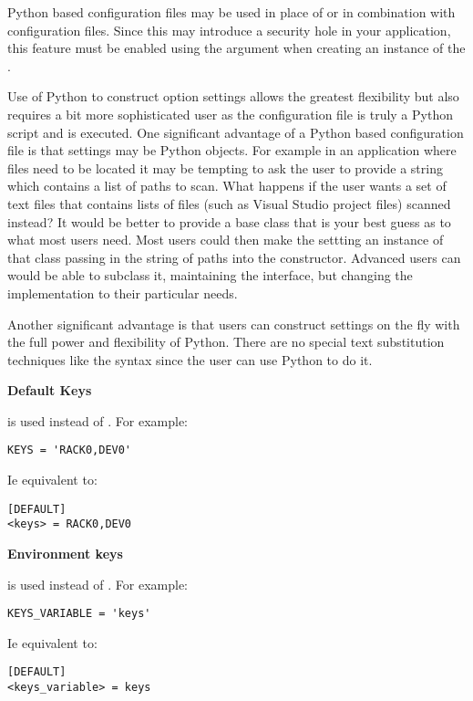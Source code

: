 \documentclass{howto}
\begin{document}
Python based configuration files may be used in place of or in combination 
with  configuration files.  Since this may introduce a security
hole in your application, this feature must be enabled using the 
argument when creating an instance of the .

Use of Python to construct option settings allows the greatest flexibility
but also requires a bit more sophisticated user as the configuration file
is truly a Python script and is executed.  One significant advantage of
a Python based configuration file is that settings may be Python objects.
For example in an application where files need to be located it may be 
tempting to ask the user to provide a string which contains a list of paths to 
scan.  What happens if the user wants a set of text files that contains lists 
of files (such as Visual Studio project files) scanned instead?  It would be 
better to provide a base class that is your best guess as to what most users 
need.  Most users could then make the settting an instance of that class passing 
in the string of paths into the constructor.  Advanced users can would be able 
to subclass it, maintaining the interface, but changing the implementation to 
their particular needs.

Another significant advantage is that users can construct settings on the fly
with the full power and flexibility of Python.  There are no special text 
substitution techniques like the  syntax since the user can use
Python to do it.

\textbf{Default Keys}

 is used instead of .  For example:

\begin{verbatim}
KEYS = 'RACK0,DEV0'
\end{verbatim}
Ie equivalent to:
\begin{verbatim}
[DEFAULT]
<keys> = RACK0,DEV0
\end{verbatim}

\textbf{Environment keys}

 is used instead of .  For example:

\begin{verbatim}
KEYS_VARIABLE = 'keys'
\end{verbatim}
Ie equivalent to:
\begin{verbatim}
[DEFAULT]
<keys_variable> = keys
\end{verbatim}
\end{document}
